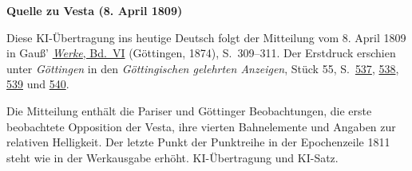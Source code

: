 \clearpage\thispagestyle{empty}
\begin{center}\textbf{Quelle zu Vesta (8. April 1809)}\end{center}
\noindent Diese KI-Übertragung ins heutige Deutsch folgt der Mitteilung vom 8. April 1809 in Gauß’ \href{https://gdz.sub.uni-goettingen.de/id/PPN236007467}{\textit{Werke}, Bd.~VI} (Göttingen, 1874), S.~309--311. Der Erstdruck erschien unter \textit{Göttingen} in den \textit{Göttingischen gelehrten Anzeigen}, Stück 55, S.~\href{https://www.digitale-sammlungen.de/en/view/bsb10538675?page=539}{537}, \href{https://www.digitale-sammlungen.de/en/view/bsb10538675?page=540}{538}, \href{https://www.digitale-sammlungen.de/en/view/bsb10538675?page=541}{539} und \href{https://www.digitale-sammlungen.de/en/view/bsb10538675?page=542}{540}.
\par\medskip
Die Mitteilung enthält die Pariser und Göttinger Beobachtungen, die erste beobachtete Opposition der Vesta, ihre vierten Bahnelemente und Angaben zur relativen Helligkeit. Der letzte Punkt der Punktreihe in der Epochenzeile 1811 steht wie in der Werkausgabe erhöht. KI-Übertragung und KI-Satz.
\clearpage
